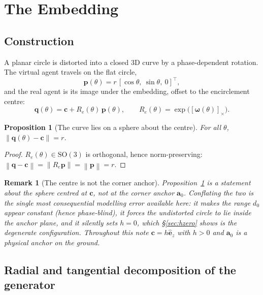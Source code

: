 \documentclass[11pt,a4paper]{article}
\newtheorem{proposition}{Proposition}
\newtheorem{remark}{Remark}
\newcommand{\SO}{\mathrm{SO}}
\newcommand{\ez}{\hat{\bm{e}}_z}
\newcommand{\q}{\bm{q}}
\newcommand{\pv}{\bm{p}}
\newcommand{\av}{\bm{a}}
\newcommand{\cv}{\bm{c}}
\newcommand{\Rot}{R}
\newcommand{\skewm}[1]{\left[#1\right]_\times}
\newcommand{\norm}[1]{\left\lVert#1\right\rVert}
\begin{document}
\section{The Embedding}
\label{sec:embedding}

\subsection{Construction}

A planar circle is distorted into a closed 3D curve by a phase-dependent
rotation. The virtual agent travels on the flat circle,
\begin{equation}
\pv(\theta) = r\,[\cos\theta,\ \sin\theta,\ 0]^\top,
\end{equation}
and the real agent is its image under the embedding, offset to the encirclement
centre:
\begin{equation}
\q(\theta) = \cv + \Rot_e(\theta)\,\pv(\theta),
\qquad
\Rot_e(\theta) = \exp\!\big(\skewm{\bm\omega(\theta)}\big).
\label{eq:embedding}
\end{equation}

\begin{proposition}[The curve lies on a sphere about the centre]
\label{prop:sphere}
For all $\theta$, $\norm{\q(\theta) - \cv} = r$.
\end{proposition}
\begin{proof}
$\Rot_e(\theta)\in\SO(3)$ is orthogonal, hence norm-preserving:
$\norm{\q-\cv} = \norm{\Rot_e\pv} = \norm{\pv} = r$.
\end{proof}

\begin{remark}[The centre is not the corner anchor]
\label{rem:notcorner}
Proposition~\ref{prop:sphere} is a statement about the sphere centred at $\cv$,
\emph{not} at the corner anchor $\av_0$. Conflating the two is the single most
consequential modelling error available here: it makes the range $d_0$ appear
constant (hence phase-blind), it forces the undistorted circle to lie
\emph{inside} the anchor plane, and it silently sets $h=0$, which
\S\ref{sec:hzero} shows is the degenerate configuration. Throughout this note
$\cv = h\ez$ with $h>0$ and $\av_0$ is a physical anchor on the ground.
\end{remark}

\subsection{Radial and tangential decomposition of the generator}
\label{sec:decomposition}
\end{document}
